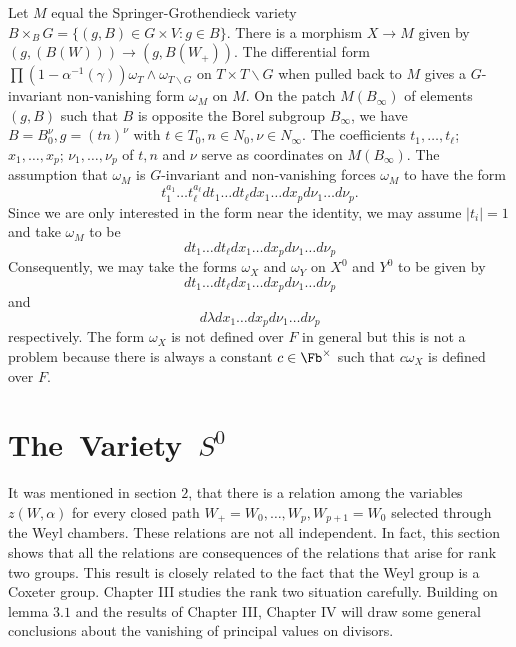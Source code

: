 \documentclass{memo-l}
\theoremstyle{definition}
\theoremstyle{remark}
\numberwithin{section}{chapter}
\numberwithin{equation}{chapter}
\begin{document}
Let $M$ equal the Springer-Grothendieck variety $B \times_{B}G = \{(g,B) \in
G \times V : g \in B\}$.
 There is a morphism $X {\to} M$ given by $(g,(B(W))) {\to} (g,B(W_{+}))$.
 The differential form $\prod (1-{\alpha}^{-1}({\gamma})){\omega}_{T}
\wedge
{\omega}_{T\backslash G}$ on $T \times T\backslash G$ when pulled back to $M$ gives a
$G$-invariant non-vanishing form ${\omega}_{M}$ on $M$.
 On the patch $M(B_{{\infty}})$ of elements $(g,B)$ such that $B$ is opposite
the Borel subgroup $B_{{\infty}}$, we have $B = B_{0}^{{\nu}}, g =
(tn)^{{\nu}}$ with $t \in T_{0}, n \in N_{0}, {\nu} \in N_{{\infty}}$.
 The coefficients $t_{1},\ldots ,t_\ell$; $x_1,\ldots ,x_p$;
$\nu_1, \ldots ,\nu_p$ of ${t}, {n}$ and ${{\nu}}$ serve as coordinates on
$M(B_{{\infty}})$.
 The assumption that ${\omega}_{M}$ is $G$-invariant and non-vanishing
forces ${\omega}_{M}$ to have the form
$$
t_{1}^{a_1} \ldots t_{\ell}^{a_\ell} dt_{1}\ldots
dt_{{\ell}}dx_{1} \ldots dx_{p}d{\nu}_{1}\ldots d{\nu}_{p} .
$$
Since we are only interested in the form near the identity, we may assume
$\vert t_{i}\vert =1$ and take ${\omega}_{M}$ to be
$$
dt_1\ldots dt_\ell dx_1 \ldots dx_p d\nu_1\ldots d\nu_p
$$
Consequently, we may take the forms ${\omega}_{X}$ and ${\omega}_{Y}$ on
$X^{0}$ and $Y^{0}$ to be given by
$$
dt_{1}\ldots dt_{{\ell}}dx_{1}\ldots dx_{p}d{\nu}_{1}\ldots d{\nu}_{p}
$$
and
$$
d{\lambda}dx_{1}\ldots dx_{p}d{\nu}_{1}\ldots d{\nu}_{p}
$$
respectively.  The form ${\omega}_{X}$ is not defined over $F$
in general but this is not a problem because there is always a
constant $c \in \Fb^{\times}$ such that $c{\omega}_{X}$ is defined over $F$.

\section{{The\ Variety\ $S^0$}}   

   It was mentioned in section $2$, that there is a relation among the
variables $z(W,{\alpha})$ for every closed path $W_{+}=W_{0},\ldots ,
W_{p},W_{p+1}=W_{0}$ selected through the Weyl chambers.
 These relations are not all independent.
 In fact, this section shows that all the relations are consequences of
the relations that arise for rank two groups.
 This result is closely related to the fact that the Weyl group is a
Coxeter group.
 Chapter III studies the rank two situation carefully.
 Building on lemma $3.1$ and the results of Chapter III, Chapter IV will
draw some general conclusions about the vanishing of principal values on
divisors.
\end{document}
